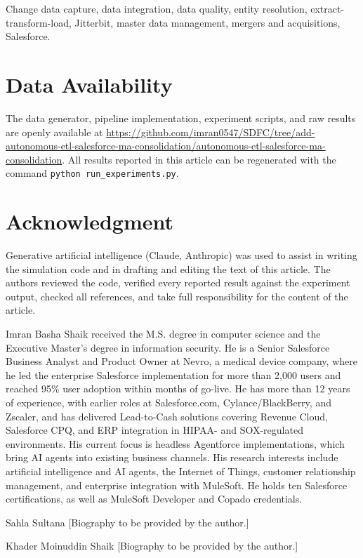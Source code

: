 \documentclass{ieeeaccess}
\begin{document}
\begin{keywords}
Change data capture, data integration, data quality, entity resolution, extract-transform-load, Jitterbit, master data management, mergers and acquisitions, Salesforce.
\end{keywords}

\titlepgskip=-21pt

\maketitle



\section*{Data Availability}
The data generator, pipeline implementation, experiment scripts, and raw results are openly available at \url{https://github.com/imran0547/SDFC/tree/add-autonomous-etl-salesforce-ma-consolidation/autonomous-etl-salesforce-ma-consolidation}. All results reported in this article can be regenerated with the command \texttt{python run\_experiments.py}.

\section*{Acknowledgment}
Generative artificial intelligence (Claude, Anthropic) was used to assist in writing the simulation code and in drafting and editing the text of this article. The authors reviewed the code, verified every reported result against the experiment output, checked all references, and take full responsibility for the content of the article.




\begin{IEEEbiographynophoto}{Imran Basha Shaik}
received the M.S. degree in computer science and the Executive Master's degree in information security. He is a Senior Salesforce Business Analyst and Product Owner at Nevro, a medical device company, where he led the enterprise Salesforce implementation for more than 2,000 users and reached 95\% user adoption within months of go-live. He has more than 12 years of experience, with earlier roles at Salesforce.com, Cylance/BlackBerry, and Zscaler, and has delivered Lead-to-Cash solutions covering Revenue Cloud, Salesforce CPQ, and ERP integration in HIPAA- and SOX-regulated environments. His current focus is headless Agentforce implementations, which bring AI agents into existing business channels. His research interests include artificial intelligence and AI agents, the Internet of Things, customer relationship management, and enterprise integration with MuleSoft. He holds ten Salesforce certifications, as well as MuleSoft Developer and Copado credentials.
\end{IEEEbiographynophoto}

\begin{IEEEbiographynophoto}{Sahla Sultana}
[Biography to be provided by the author.]
\end{IEEEbiographynophoto}

\begin{IEEEbiographynophoto}{Khader Moinuddin Shaik}
[Biography to be provided by the author.]
\end{IEEEbiographynophoto}

\EOD
\end{document}
